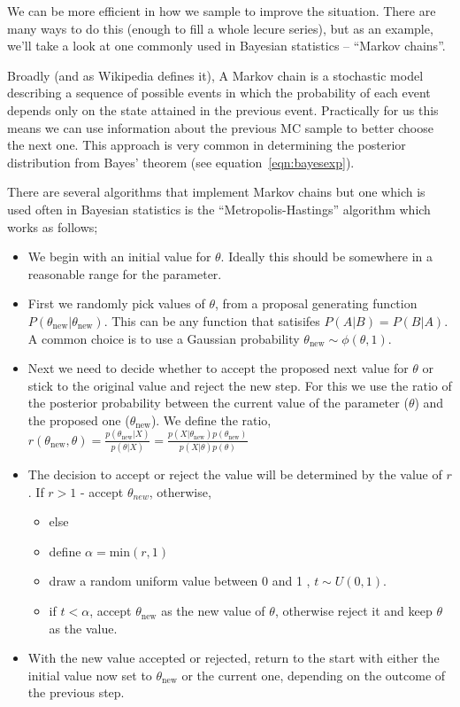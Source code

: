 We can be more efficient in how we sample to improve the situation. There 
are many ways to do this (enough to fill a whole lecure series), but 
as an example, we'll take a look at one commonly used in Bayesian statistics -- 
``Markov chains''. 

Broadly (and as Wikipedia defines it), A Markov chain 
is a stochastic model describing a sequence of possible events 
in which the probability of each event depends only on the state 
attained in the previous event. Practically for us this means we 
can use information about the previous MC sample to better choose 
the next one. This approach is very common in determining the  
posterior distribution from Bayes' theorem (see 
equation~\ref{eqn:bayesexp}). 

There are several algorithms that implement Markov chains 
but one which is used often in Bayesian statistics is the ``Metropolis-Hastings'' 
algorithm which works as follows; 

\begin{itemize}
 \item{
    We begin with an initial value for $\theta$. Ideally this should 
    be somewhere in a reasonable range for the parameter. 
 }
 \item{
     First we randomly pick values of $\theta$, 
    from a proposal generating function 
    $P(\theta_{\text{new}}|\theta_{\text{new}})$. This can be any 
    function that satisifes $P(A|B) = P(B|A)$. A common choice is to 
    use a Gaussian probability $\theta_{\text{new}}\sim \phi(\theta,1)$.
    }
\item{
    Next we need to decide whether to accept the proposed next value 
    for $\theta$ or stick to the original value and reject the new step. 
    For this we use the ratio of the posterior probability 
    between the current value of the parameter 
    ($\theta$) and the proposed one ($\theta_{\text{new}}$). 
    We define the ratio, 
    $r(\theta_{\text{new}},\theta) = \frac{p(\theta_{\text{new}}|X)}{p(\theta|X)} = \frac{p(X|\theta_{\text{new}})p(\theta_{\text{new}})}{p(X|\theta)p(\theta)}$
}
\item{
    The decision to accept or reject the value will be determined 
    by the value of $r$. If $r>1$ - accept $\theta_{new}$, otherwise,
}
  \begin{itemize}
  \item{else} 
     \item{define $\alpha = \text{min}(r,1)$}
     \item{draw a random uniform value between 0 and 1 , $t\sim U(0,1)$. }
     \item{if $t<\alpha$, accept $\theta_\text{new}$ as the 
     new value of $\theta$, otherwise reject it and 
     keep $\theta$ as the value.}
  \end{itemize} 
\item{With the new value accepted  or rejected, return  to the start  
with either the initial value now set to $\theta_\text{new}$ or 
the current one, depending on the outcome of the previous step.}
\end{itemize}

